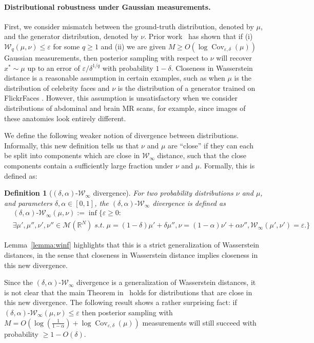 \documentclass{article}
\newtheorem{definition}[theorem]{Definition}
\newcounter{example}[section]
\newcommand{\eps}{\varepsilon}
\newcommand{\R}{\mathbb{R}}
\newcommand{\cM}{\mathcal M}
\newcommand{\cW}{\mathcal W}
\DeclareMathOperator{\cov}{Cov}
\begin{document}
\paragraph{Distributional robustness under Gaussian measurements.}
First, we consider mismatch between the ground-truth distribution, denoted by $\mu$, and the generator distribution, denoted by $\nu$. Prior work~\cite{jalal2021instance} has shown that if (i) $\cW_q(\mu, \nu) \leq \eps$ for some $q\geq 1$ and (ii) we are given $M \geq O(\log \cov_{\eps, \delta} (\mu))$ Gaussian measurements, then posterior sampling with respect to $\nu$ will recover $x^* \sim \mu$ up to an error of $\eps / \delta^{1/q}$ with probability $1-\delta$. Closeness in Wasserstein distance is a reasonable assumption in certain examples, such as when $\mu$ is the distribution of celebrity faces and $\nu$ is the distribution of a generator trained on FlickrFaces \cite{karras2019style}. However, this assumption is unsatisfactory when we consider distributions of abdominal and brain MR scans, for example, since images of these anatomies look entirely different.  

We define the following weaker notion of divergence between distributions. Informally, this new definition tells us that $\nu$ and $\mu$ are ``close'' if they can each be split into components which are close in $\cW_\infty$ distance, such that the close components contain a sufficiently large fraction under $\nu$ and $\mu$. Formally, this is defined as:
\begin{definition}[$(\delta,\alpha)\text{-}\cW_\infty$ divergence]
  For two probability distributions $\nu$ and $\mu$, and parameters
  $\delta, \alpha \in [0,1]$, the $(\delta, \alpha)\text{-}\cW_\infty$
  divergence is defined as
  \begin{align*}
    &(\delta, \alpha)\text{-}\cW_\infty(\mu, \nu) := \inf \{ \eps \geq 0: \\ 
    & \exists \mu', \mu'', \nu', \nu'' \in \cM(\R^N) \; s.t.\; \mu = (1-\delta)
  \mu' + \delta \mu'', \nu = (1 - \alpha) \nu' + \alpha \nu'', \cW_\infty(\mu',
\nu') = \eps. \}
  \end{align*}
\end{definition}
Lemma~\ref{lemma:winf} highlights that this is a strict generalization of Wasserstein distances, in the sense that closeness in Wasserstein distance implies closeness in this new divergence.

Since the $(\delta,\alpha)\text{-}\cW_\infty$ divergence is a
generalization of Wasserstein distances, it is not clear that the main
Theorem in~\cite{jalal2021instance} holds for distributions that are close in
this new divergence.  The following result shows a rather
surprising fact: if $(\delta,\alpha)\text{-}\cW_\infty(\mu , \nu) \leq \eps$
then posterior sampling with $M =O \left( \log \left( \frac{1}{1 -
\alpha} \right) + \log \cov_{\eps,\delta} (\mu) \right) $
measurements will still succeed with probability $\geq 1-O(\delta)$.  
\end{document}
